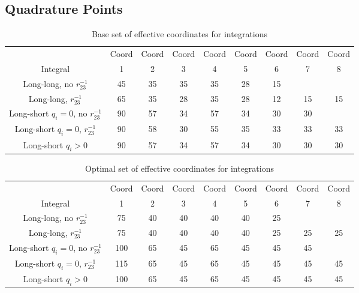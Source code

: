 \documentclass[Dissertation.tex]{subfiles}
\begin{document}



\subsection{Quadrature Points}
\label{sec:QuadraturePoints}


\begin{table}[H]
\centering
\footnotesize
\begin{tabular}{c c c c c c c c c}
\toprule
 & Coord & Coord & Coord & Coord & Coord & Coord & Coord & Coord\\
Integral & 1 & 2 & 3 & 4 & 5 & 6 & 7 & 8 \\
\midrule
 Long-long, no $r_{23}^{-1}$ & 45 & 35 & 35 & 35 & 28 & 15 & & \\
 Long-long, $r_{23}^{-1}$ & 65 & 35 & 28 & 35 & 28 & 12 & 15 & 15 \\
\midrule
 Long-short $q_i = 0$, no $r_{23}^{-1}$ & 90 & 57 & 34 & 57 & 34 & 30 & 30 & \\
 Long-short $q_i = 0$, $r_{23}^{-1}$ & 90 & 58 & 30 & 55 & 35 & 33 & 33 & 33 \\
 Long-short $q_i > 0$ & 90 & 57 & 34 & 57 & 34 & 30 & 30 & 30 \\
\bottomrule
\end{tabular}
\caption{Base set of effective coordinates for integrations}
\label{tab:BaseEffectiveCoords}
\end{table}

\begin{table}[H]
\centering
\footnotesize
\begin{tabular}{c c c c c c c c c}
\toprule
 & Coord & Coord & Coord & Coord & Coord & Coord & Coord & Coord\\
Integral & 1 & 2 & 3 & 4 & 5 & 6 & 7 & 8 \\
\midrule
 Long-long, no $r_{23}^{-1}$			&  75 & 40 & 40 & 40 & 40 & 25 & & \\
 Long-long, $r_{23}^{-1}$				&  75 & 40 & 40 & 40 & 40 & 25 & 25 & 25 \\
\midrule
 Long-short $q_i = 0$, no $r_{23}^{-1}$	& 100 & 65 & 45 & 65 & 45 & 45 & 45 & \\
 Long-short $q_i = 0$, $r_{23}^{-1}$	& 115 & 65 & 45 & 65 & 45 & 45 & 45 & 45 \\
 Long-short $q_i > 0$					& 100 & 65 & 45 & 65 & 45 & 45 & 45 & 45 \\
\bottomrule
\end{tabular}
\caption{Optimal set of effective coordinates for integrations}
\label{tab:OptimalEffectiveCoords}
\end{table}
\end{document}
